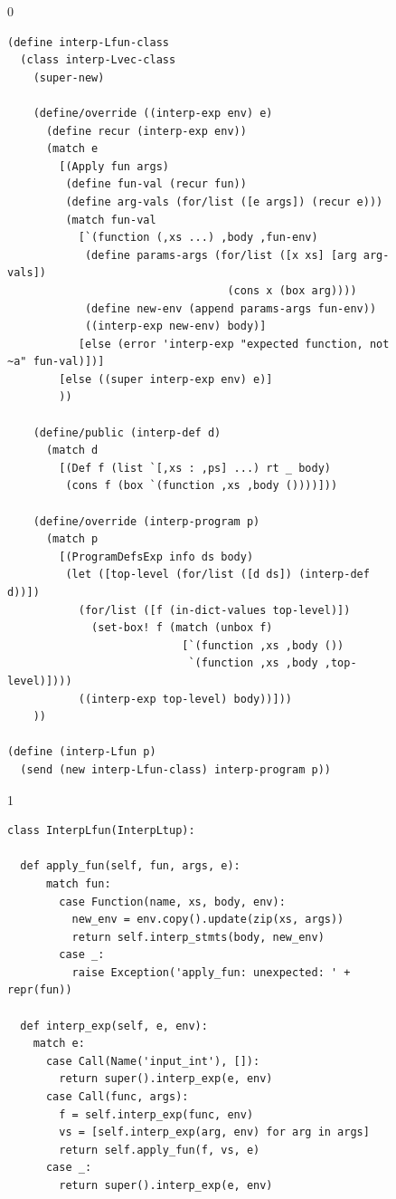 \documentclass[7x10]{TimesAPriori_MIT}%
\def\racketEd{0}
\def\pythonEd{1}
\def\edition{0}
\numberwithin{theorem}{chapter}
\numberwithin{definition}{chapter}
\numberwithin{equation}{chapter}
\begin{document}
\begin{figure}[tp]
  \begin{tcolorbox}[colback=white]
    {\if\edition\racketEd  
\begin{lstlisting}
(define interp-Lfun-class
  (class interp-Lvec-class
    (super-new)

    (define/override ((interp-exp env) e)
      (define recur (interp-exp env))
      (match e
        [(Apply fun args)
         (define fun-val (recur fun))
         (define arg-vals (for/list ([e args]) (recur e)))
         (match fun-val
           [`(function (,xs ...) ,body ,fun-env)
            (define params-args (for/list ([x xs] [arg arg-vals])
                                  (cons x (box arg))))
            (define new-env (append params-args fun-env))
            ((interp-exp new-env) body)]
           [else (error 'interp-exp "expected function, not ~a" fun-val)])]
        [else ((super interp-exp env) e)]
        ))

    (define/public (interp-def d)
      (match d
        [(Def f (list `[,xs : ,ps] ...) rt _ body)
         (cons f (box `(function ,xs ,body ())))]))

    (define/override (interp-program p)
      (match p
        [(ProgramDefsExp info ds body)
         (let ([top-level (for/list ([d ds]) (interp-def d))])
           (for/list ([f (in-dict-values top-level)])
             (set-box! f (match (unbox f)
                           [`(function ,xs ,body ())
                            `(function ,xs ,body ,top-level)])))
           ((interp-exp top-level) body))]))
    ))

(define (interp-Lfun p)
  (send (new interp-Lfun-class) interp-program p))
\end{lstlisting}
\fi}
{\if\edition\pythonEd
\begin{lstlisting}
class InterpLfun(InterpLtup):
  
  def apply_fun(self, fun, args, e):
      match fun:
        case Function(name, xs, body, env):
          new_env = env.copy().update(zip(xs, args))
          return self.interp_stmts(body, new_env)
        case _:
          raise Exception('apply_fun: unexpected: ' + repr(fun))
    
  def interp_exp(self, e, env):
    match e:
      case Call(Name('input_int'), []):
        return super().interp_exp(e, env)      
      case Call(func, args):
        f = self.interp_exp(func, env)
        vs = [self.interp_exp(arg, env) for arg in args]
        return self.apply_fun(f, vs, e)
      case _:
        return super().interp_exp(e, env)


\end{lstlisting}}
\end{tcolorbox}
\end{figure}
\end{document}
